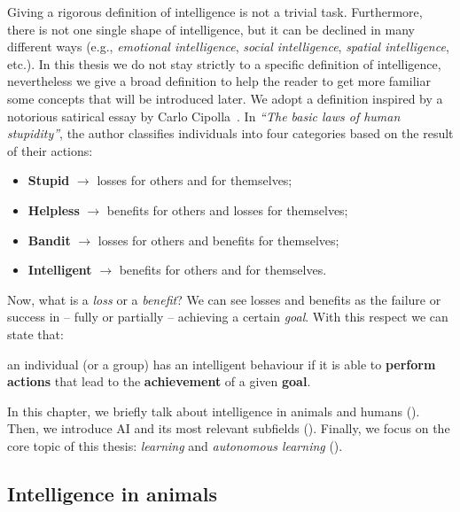 Giving a rigorous definition of intelligence is not a trivial task.
%
Furthermore, there is not one single shape of intelligence, but it can be declined in many different ways (e.g., \emph{emotional intelligence}, \emph{social intelligence}, \emph{spatial intelligence}, etc.).
%
In this thesis we do not stay strictly to a specific definition of intelligence, nevertheless we give a broad definition to help the reader to get more familiar some concepts that will be introduced later.
%
We adopt a definition inspired by a notorious satirical essay by Carlo Cipolla~\cite{cipolla2013allegro}.
%
In \emph{``The basic laws of human stupidity''}, the author classifies individuals into four categories based on the result of their actions:
%
\begin{itemize}
    \item \textbf{Stupid} $\rightarrow$ losses for others and for themselves;
    \item \textbf{Helpless} $\rightarrow$ benefits for others and losses for themselves;
    \item \textbf{Bandit} $\rightarrow$ losses for others and benefits for themselves;
    \item \textbf{Intelligent} $\rightarrow$ benefits for others and for themselves.
\end{itemize}
%
Now, what is a \emph{loss} or a \emph{benefit}?
%
We can see losses and benefits as the failure or success in -- fully or partially -- achieving a certain \emph{goal}.
%
With this respect we can state that:
%
\begin{definition}
    \label{def:intelligence}
    an individual (or a group) has an intelligent behaviour if it is able to \textbf{perform actions} that lead to the \textbf{achievement} of a given \textbf{goal}.
\end{definition}


In this chapter, we briefly talk about intelligence in animals and humans ().
%
Then, we introduce \gls{AI} and its most relevant subfields ().
%
Finally, we focus on the core topic of this thesis: \emph{learning} and \emph{autonomous learning} ().


\subsection{Intelligence in animals}\label{subsec:intelligence-in-animals}

